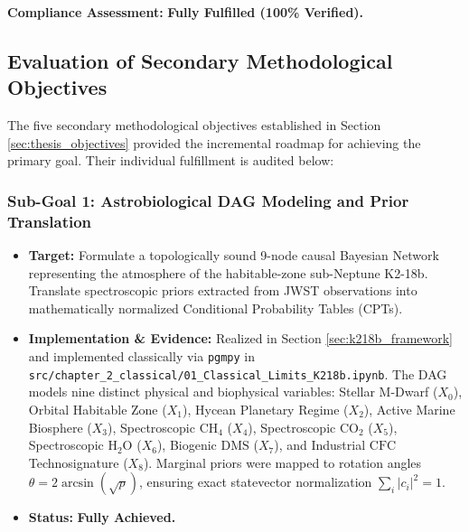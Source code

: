 \noindent\textbf{Compliance Assessment:} \textbf{Fully Fulfilled (100\% Verified).}

\subsection{Evaluation of Secondary Methodological Objectives}\label{subsec:audit_secondary_objectives}

The five secondary methodological objectives established in Section \ref{sec:thesis_objectives} provided the incremental roadmap for achieving the primary goal. Their individual fulfillment is audited below:

\subsubsection{Sub-Goal 1: Astrobiological DAG Modeling and Prior Translation}
\begin{itemize}
    \item \textbf{Target:} Formulate a topologically sound 9-node causal Bayesian Network representing the atmosphere of the habitable-zone sub-Neptune K2-18b. Translate spectroscopic priors extracted from JWST observations \cite{madhusudhan2023} into mathematically normalized Conditional Probability Tables (CPTs).
    \item \textbf{Implementation \& Evidence:} Realized in Section \ref{sec:k218b_framework} and implemented classically via \texttt{pgmpy} in \texttt{src/chapter\_2\_classical/01\_Classical\_Limits\_K218b.ipynb}. The DAG models nine distinct physical and biophysical variables: Stellar M-Dwarf ($X_0$), Orbital Habitable Zone ($X_1$), Hycean Planetary Regime ($X_2$), Active Marine Biosphere ($X_3$), Spectroscopic $\mathrm{CH}_4$ ($X_4$), Spectroscopic $\mathrm{CO}_2$ ($X_5$), Spectroscopic $\mathrm{H}_2\mathrm{O}$ ($X_6$), Biogenic $\mathrm{DMS}$ ($X_7$), and Industrial $\mathrm{CFC}$ Technosignature ($X_8$). Marginal priors were mapped to rotation angles $\theta = 2 \arcsin(\sqrt{p})$, ensuring exact statevector normalization $\sum_i |c_i|^2 = 1$.
    \item \textbf{Status:} \textbf{Fully Achieved.}
\end{itemize}

